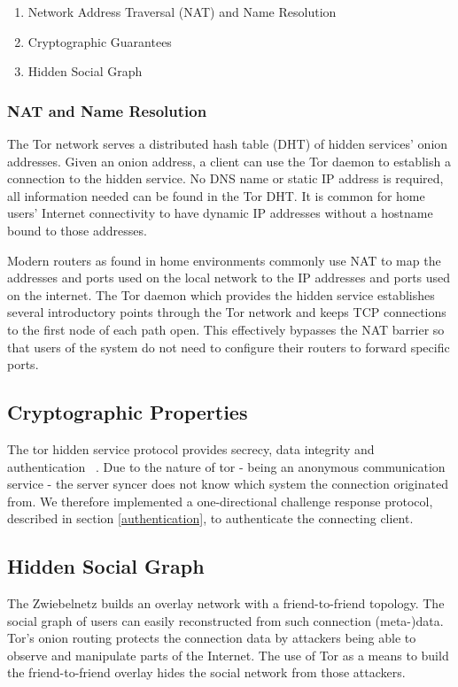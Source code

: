 \documentclass[12pt]{article}
\begin{document}
\begin{enumerate}
\item Network Address Traversal (NAT) and Name Resolution
\item Cryptographic Guarantees
\item Hidden Social Graph
\end{enumerate}

\subsubsection*{NAT and Name Resolution}

The Tor network serves a distributed hash table (DHT) of hidden services' onion addresses. Given an onion address, a client can use the Tor daemon to establish a connection to the hidden service. No DNS name or static IP address is required, all information needed can be found in the Tor DHT. It is common for home users' Internet connectivity to have dynamic IP addresses without a hostname bound to those addresses.

Modern routers as found in home environments commonly use NAT to map the addresses and ports used on the local network to the IP addresses and ports used on the internet. The Tor daemon which provides the hidden service establishes several introductory points through the Tor network and keeps TCP connections to the first node of each path open. This effectively bypasses the NAT barrier so that users of the system do not need to configure their routers to forward specific ports.

\subsection*{Cryptographic Properties}

The tor hidden service protocol provides secrecy, data integrity and authentication ~\cite{Dingledine:2004:TSO:1251375.1251396}. Due to the nature of tor - being an anonymous communication service - the server syncer does not know which system the connection originated from. We therefore implemented a one-directional challenge response protocol, described in section \ref{authentication}, to authenticate the connecting client.

\subsection*{Hidden Social Graph}

The Zwiebelnetz builds an overlay network with a friend-to-friend topology. The social graph of users can easily reconstructed from such connection \mbox{(meta-)data}. Tor's onion routing protects the connection data by attackers being able to observe and manipulate parts of the Internet. The use of Tor as a means to build the friend-to-friend overlay hides the social network from those attackers.
\end{document}
